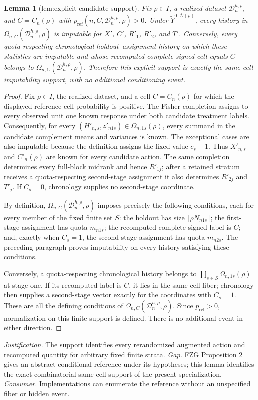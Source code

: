 \documentclass{article}
\newtheorem{lemma}{Lemma}
\begin{document}
\begin{lemma}[lem:explicit-candidate-support]\label{lem:explicit-candidate-support}
Fix \(\rho\in I\), a realized dataset \(\mathcal D_n^{h,\rho}\), and \(C=C_n(\rho)\) with \(p_{\mathrm{ref}}(n,C,\mathcal D_n^{h,\rho},\rho)>0\). Under \(\widetilde Y^{0,\mathcal D(\rho)}\), every history in \(\Omega_{n,C}(\mathcal D_n^{h,\rho},\rho)\) is imputable for \(X'\), \(C'\), \(R'_1\), \(R'_2\), and \(T'\). Conversely, every quota-respecting chronological holdout--assignment history on which these statistics are imputable and whose recomputed complete signed cell equals \(C\) belongs to \(\Omega_{n,C}(\mathcal D_n^{h,\rho},\rho)\). Therefore this explicit support is exactly the same-cell imputability support, with no additional conditioning event.
\end{lemma}
\begin{proof}
Fix \(\rho\in I\), the realized dataset, and a cell \(C=C_n(\rho)\) for which the displayed reference-cell probability is positive.  The Fisher completion assigns to every observed unit one known response under both candidate treatment labels.  Consequently, for every \((H'_{n,s},z'_{n1s})\in\Omega_{n,1s}(\rho)\), every summand in the candidate complement means and variances is known.  The exceptional cases are also imputable because the definition assigns the fixed value \(c_s-1\).  Thus \(X'_{n,s}\) and \(C'_n(\rho)\) are known for every candidate action.  The same completion determines every full-block midrank and hence \(R'_{1j}\); after a retained stratum receives a quota-respecting second-stage assignment it also determines \(R'_{2j}\) and \(T'_j\).  If \(C_s=0\), chronology supplies no second-stage coordinate.

By definition, \(\Omega_{n,C}(\mathcal D_n^{h,\rho},\rho)\) imposes precisely the following conditions, each for every member of the fixed finite set \(S\): the holdout has size \(\lfloor\rho N_{n1s}\rfloor\); the first-stage assignment has quota \(m_{n1s}\); the recomputed complete signed label is \(C\); and, exactly when \(C_s=1\), the second-stage assignment has quota \(m_{n2s}\).  The preceding paragraph proves imputability on every history satisfying these conditions.

Conversely, a quota-respecting chronological history belongs to \(\prod_{s\in S}\Omega_{n,1s}(\rho)\) at stage one.  If its recomputed label is \(C\), it lies in the same-cell fiber; chronology then supplies a second-stage vector exactly for the coordinates with \(C_s=1\).  These are all the defining conditions of \(\Omega_{n,C}(\mathcal D_n^{h,\rho},\rho)\).  Since \(p_{\mathrm{ref}}>0\), normalization on this finite support is defined.  There is no additional event in either direction.
\end{proof}
\par\smallskip\noindent \textit{Justification.} The support identifies every rerandomized augmented action and recomputed quantity for arbitrary fixed finite strata. \textit{Gap.} FZG Proposition 2 gives an abstract conditional reference under its hypotheses; this lemma identifies the exact combinatorial same-cell support of the present specialization. \textit{Consumer.} Implementations can enumerate the reference without an unspecified fiber or hidden event.
\end{document}
